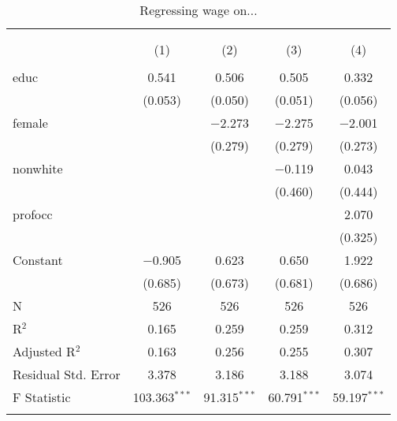 
\begin{table}[!htbp] \centering 
  \caption{Regressing wage on...} 
  \label{} 
\scriptsize 
\begin{tabular}{@{\extracolsep{5pt}}lcccc} 
\\[-1.8ex]\hline \\[-1.8ex] 
\\[-1.8ex] & (1) & (2) & (3) & (4)\\ 
\hline \\[-1.8ex] 
 educ & 0.541 & 0.506 & 0.505 & 0.332 \\ 
  & (0.053) & (0.050) & (0.051) & (0.056) \\ 
  female &  & $-$2.273 & $-$2.275 & $-$2.001 \\ 
  &  & (0.279) & (0.279) & (0.273) \\ 
  nonwhite &  &  & $-$0.119 & 0.043 \\ 
  &  &  & (0.460) & (0.444) \\ 
  profocc &  &  &  & 2.070 \\ 
  &  &  &  & (0.325) \\ 
  Constant & $-$0.905 & 0.623 & 0.650 & 1.922 \\ 
  & (0.685) & (0.673) & (0.681) & (0.686) \\ 
 N & 526 & 526 & 526 & 526 \\ 
R$^{2}$ & 0.165 & 0.259 & 0.259 & 0.312 \\ 
Adjusted R$^{2}$ & 0.163 & 0.256 & 0.255 & 0.307 \\ 
Residual Std. Error & 3.378 & 3.186 & 3.188 & 3.074 \\ 
F Statistic & 103.363$^{***}$ & 91.315$^{***}$ & 60.791$^{***}$ & 59.197$^{***}$ \\ 
\hline \\[-1.8ex] 
\end{tabular} 
\end{table} 
